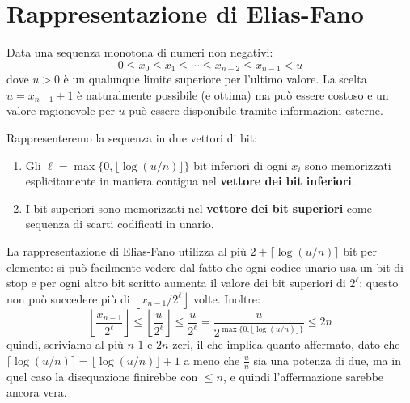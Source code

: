 \documentclass[\main/main.tex]{subfiles}
\begin{document}
\section{Rappresentazione di Elias-Fano}
\begin{definition}
    Data una sequenza monotona di numeri non negativi:
    \[
        0 \leq x_{0} \leq x_{1} \leq \cdots \leq x_{n-2} \leq x_{n-1}<u
    \]
    dove \(u > 0\) è un qualunque limite superiore per l'ultimo valore. La scelta \(u=x_{n-1}+1\) è naturalmente possibile (e ottima) ma può essere costoso e un valore ragionevole per \(u\) può essere disponibile tramite informazioni esterne.
    
    Rappresenteremo la sequenza in due vettori di bit:
    \begin{enumerate}
        \item Gli \(\ell=\max \{0,\lfloor\log (u / n)\rfloor\}\) bit inferiori di ogni \(x_i\) sono memorizzati esplicitamente in maniera contigua nel \textbf{vettore dei bit inferiori}.
        \item I bit superiori sono memorizzati nel \textbf{vettore dei bit superiori} come sequenza di scarti codificati in unario.
    \end{enumerate}
\end{definition}
\begin{property}
    La rappresentazione di Elias-Fano utilizza al più \(2+\lceil\log (u / n)\rceil\) bit per elemento: si può facilmente vedere dal fatto che ogni codice unario usa un bit di stop e per ogni altro bit scritto aumenta il valore dei bit superiori di \(2^\ell\): questo non può succedere più di \(\left\lfloor x_{n-1} / 2^{\ell}\right\rfloor\) volte. Inoltre:
    \[
        \left\lfloor\frac{x_{n-1}}{2^{\ell}}\right\rfloor \leq\left\lfloor\frac{u}{2^{\ell}}\right\rfloor \leq \frac{u}{2^{\ell}}=\frac{u}{2^{\max \{0,\lfloor\log (u / n)\rfloor\}}} \leq 2 n
    \]
    quindi, scriviamo al più \(n\) \(1\) e \(2n\) zeri, il che implica quanto affermato, dato che \(\lceil\log (u / n)\rceil = \lfloor\log (u / n)\rfloor+ 1\) a meno che \(\frac{u}{n}\) sia una potenza di due, ma in quel caso la disequazione finirebbe con \(\leq n\), e quindi l'affermazione sarebbe ancora vera.
\end{property}
\end{document}

